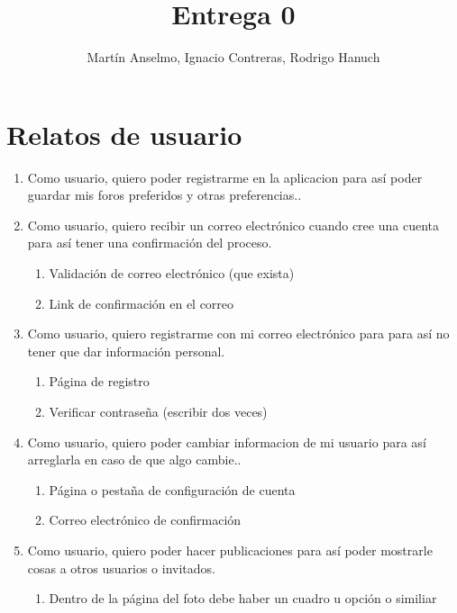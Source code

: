\documentclass[12pt, letterpaper, notitlepage]{article}
\title{\textbf{Entrega 0}}
\author{Martín Anselmo, Ignacio Contreras, Rodrigo Hanuch}
\begin{document}
\clearpage\maketitle
\thispagestyle{empty}

\newpage

\section*{Relatos de usuario}
\newcommand{\story}[3]{Como {#1}, quiero {#2} para {#3}.}

\begin{enumerate}

	\item \story{usuario}{poder registrarme en la aplicacion}	
		{así poder guardar mis foros preferidos y otras preferencias.}
		

	\item \story{usuario}{recibir un correo electrónico cuando cree una cuenta}	
		{así tener una confirmación del proceso}
		\begin{enumerate}
			\item Validación de correo electrónico (que exista)
			\item Link de confirmación en el correo		
		\end{enumerate}
		
	\item \story{usuario}{registrarme con mi correo electrónico}{para así no tener que 
		dar información personal}
		\begin{enumerate}
			\item Página de registro
			\item Verificar contraseña (escribir dos veces)
		\end{enumerate}


	\item \story{usuario}{poder cambiar informacion de mi usuario}{así arreglarla en caso de que algo cambie.}
    	\begin{enumerate}
			\item Página o pestaña de configuración de cuenta
			\item Correo electrónico de confirmación
		\end{enumerate}
   
   
   \item \story{usuario}{poder hacer publicaciones}{así poder mostrarle cosas a otros usuarios o invitados}
       	\begin{enumerate}
			\item Dentro de la página del foto debe haber un cuadro u opción  o similiar
		\end{enumerate}


\end{enumerate}
\end{document}
